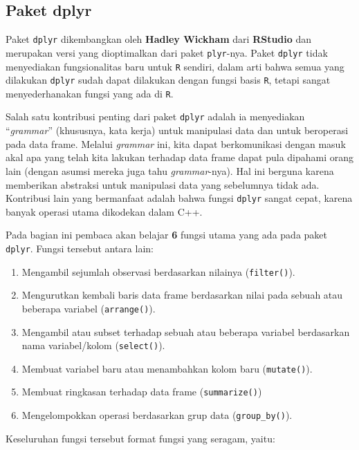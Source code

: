 \documentclass[]{book}
\providecommand{\tightlist}{%
  \setlength{\itemsep}{0pt}\setlength{\parskip}{0pt}}
\begin{document}
\subsection{Paket dplyr}\label{paket-dplyr}

Paket \texttt{dplyr} dikembangkan oleh \textbf{Hadley Wickham} dari
\textbf{RStudio} dan merupakan versi yang dioptimalkan dari paket
\texttt{plyr}-nya. Paket \texttt{dplyr} tidak menyediakan fungsionalitas
baru untuk \texttt{R} sendiri, dalam arti bahwa semua yang dilakukan
\texttt{dplyr} sudah dapat dilakukan dengan fungsi basis \texttt{R},
tetapi sangat menyederhanakan fungsi yang ada di \texttt{R}.

Salah satu kontribusi penting dari paket \texttt{dplyr} adalah ia
menyediakan ``\emph{grammar}'' (khususnya, kata kerja) untuk manipulasi
data dan untuk beroperasi pada data frame. Melalui \emph{grammar} ini,
kita dapat berkomunikasi dengan masuk akal apa yang telah kita lakukan
terhadap data frame dapat pula dipahami orang lain (dengan asumsi mereka
juga tahu \emph{grammar}-nya). Hal ini berguna karena memberikan
abstraksi untuk manipulasi data yang sebelumnya tidak ada. Kontribusi
lain yang bermanfaat adalah bahwa fungsi \texttt{dplyr} sangat cepat,
karena banyak operasi utama dikodekan dalam C++.

Pada bagian ini pembaca akan belajar \textbf{6} fungsi utama yang ada
pada paket \texttt{dplyr}. Fungsi tersebut antara lain:

\begin{enumerate}
\def\labelenumi{\arabic{enumi}.}
\tightlist
\item
  Mengambil sejumlah observasi berdasarkan nilainya (\texttt{filter()}).
\item
  Mengurutkan kembali baris data frame berdasarkan nilai pada sebuah
  atau beberapa variabel (\texttt{arrange()}).
\item
  Mengambil atau subset terhadap sebuah atau beberapa variabel
  berdasarkan nama variabel/kolom (\texttt{select()}).
\item
  Membuat variabel baru atau menambahkan kolom baru (\texttt{mutate()}).
\item
  Membuat ringkasan terhadap data frame (\texttt{summarize()})
\item
  Mengelompokkan operasi berdasarkan grup data (\texttt{group\_by()}).
\end{enumerate}

Keseluruhan fungsi tersebut format fungsi yang seragam, yaitu:
\end{document}
